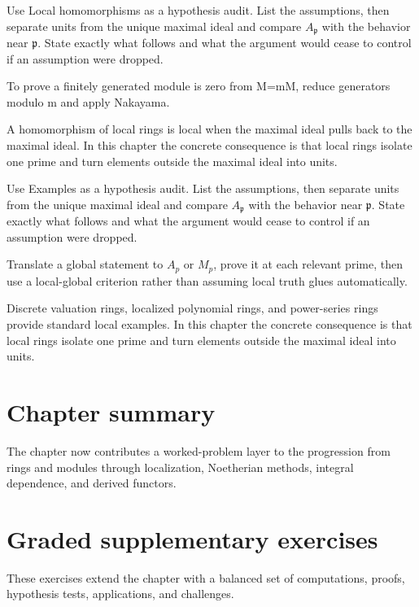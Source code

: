 \begin{exercise}\label{exr:v08-07}
Use Local homomorphisms as a hypothesis audit. List the assumptions, then separate units from the unique maximal ideal and compare \(A_{\mathfrak p}\) with the behavior near \(\mathfrak p\). State exactly what follows and what the argument would cease to control if an assumption were dropped.
\end{exercise}
\begin{hint}
To prove a finitely generated module is zero from M=mM, reduce generators modulo m and apply Nakayama.
\end{hint}
\begin{solution}
A homomorphism of local rings is local when the maximal ideal pulls back to the maximal ideal. In this chapter the concrete consequence is that local rings isolate one prime and turn elements outside the maximal ideal into units.
\end{solution}

\begin{exercise}\label{exr:v08-08}
Use Examples as a hypothesis audit. List the assumptions, then separate units from the unique maximal ideal and compare \(A_{\mathfrak p}\) with the behavior near \(\mathfrak p\). State exactly what follows and what the argument would cease to control if an assumption were dropped.
\end{exercise}
\begin{hint}
Translate a global statement to \(A_p\) or \(M_p\), prove it at each relevant prime, then use a local-global criterion rather than assuming local truth glues automatically.
\end{hint}
\begin{solution}
Discrete valuation rings, localized polynomial rings, and power-series rings provide standard local examples. In this chapter the concrete consequence is that local rings isolate one prime and turn elements outside the maximal ideal into units.
\end{solution}

\section*{Chapter summary}
The chapter now contributes a worked-problem layer to the progression from rings and modules through localization, Noetherian methods, integral dependence, and derived functors.
\section{Graded supplementary exercises}
These exercises extend the chapter with a balanced set of computations, proofs, hypothesis tests, applications, and challenges.

